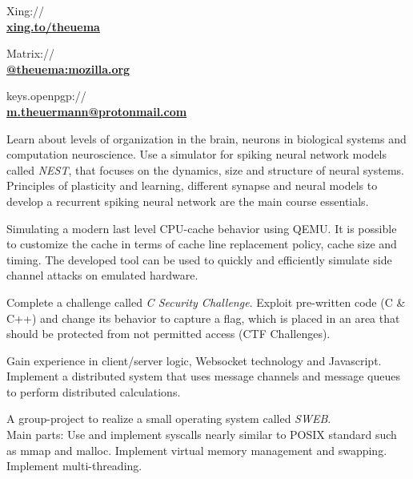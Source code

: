 \documentclass[]{resume}
\begin{document}
\begin{minipage}[t]{0.33\textwidth}
Xing://
\\\href{https://www.xing.com/profile/Mario_Theuermann}{\textbf{xing.to/theuema}} \medsep

Matrix://
\\\href{https://matrix.to/#/@theuema:mozilla.org}{\textbf{@theuema:mozilla.org}} \medsep

keys.openpgp://
\\\href{https://keys.openpgp.org/vks/v1/by-fingerprint/4BB961379C844A8F96DB6703B0A310EEC45021EC}{\textbf{m.theuermann@protonmail.com}} \medsep


\end{minipage}\quad %
\begin{minipage}[t]{0.66\textwidth} 
Learn about levels of organization in the brain, neurons in biological systems and computation neuroscience. Use a simulator for spiking neural network models called \textit{NEST}, that focuses on the dynamics, size and structure of neural systems. Principles of plasticity and learning, different synapse and neural models to develop a recurrent spiking neural network are the main course essentials. \sectionsep

Simulating a modern last level CPU-cache behavior using QEMU. It is possible to customize the cache in terms of cache line replacement policy, cache size and timing. The developed tool can be used to quickly and efficiently simulate side channel attacks on emulated hardware. \sectionsep

Complete a challenge called \textit{C Security Challenge}. Exploit pre-written code (C \& C++) and change its behavior to capture a flag, which is placed in an area that should be protected from not permitted access (CTF Challenges). \sectionsep

Gain experience in client/server logic, Websocket technology and Javascript. Implement a distributed system that uses message channels and message queues to perform distributed calculations. \sectionsep

A group-project to realize a small operating system called \textit{SWEB}. \\
Main parts: Use and implement syscalls nearly similar to POSIX standard such as mmap and malloc. Implement virtual memory management and swapping. Implement multi-threading. \sectionsep

\end{minipage} 
\vfill \vfill \vfill \vfill
\end{document}
